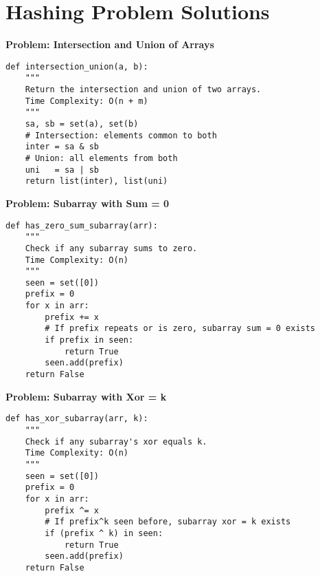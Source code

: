 % 
% 
\section*{Hashing Problem Solutions}
\noindent\textbf{Problem: Intersection and Union of Arrays}
\begin{verbatim}
def intersection_union(a, b):
    """
    Return the intersection and union of two arrays.
    Time Complexity: O(n + m)
    """
    sa, sb = set(a), set(b)
    # Intersection: elements common to both
    inter = sa & sb
    # Union: all elements from both
    uni   = sa | sb
    return list(inter), list(uni)
\end{verbatim}

\noindent\textbf{Problem: Subarray with Sum = 0}
\begin{verbatim}
def has_zero_sum_subarray(arr):
    """
    Check if any subarray sums to zero.
    Time Complexity: O(n)
    """
    seen = set([0])
    prefix = 0
    for x in arr:
        prefix += x
        # If prefix repeats or is zero, subarray sum = 0 exists
        if prefix in seen:
            return True
        seen.add(prefix)
    return False
\end{verbatim}

\noindent\textbf{Problem: Subarray with Xor = k}
\begin{verbatim}
def has_xor_subarray(arr, k):
    """
    Check if any subarray's xor equals k.
    Time Complexity: O(n)
    """
    seen = set([0])
    prefix = 0
    for x in arr:
        prefix ^= x
        # If prefix^k seen before, subarray xor = k exists
        if (prefix ^ k) in seen:
            return True
        seen.add(prefix)
    return False
\end{verbatim}

